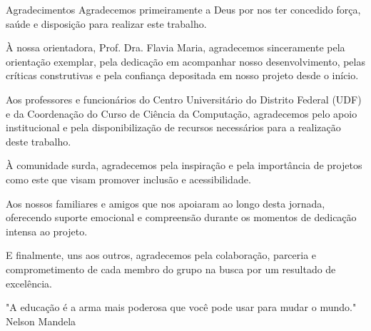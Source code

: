 \documentclass[
	10pt,				%
	openany,
    twoside,			%
	a4paper,			%
    chapter={TITLE},
    section={TITLE},
    subsection={TITLE},
    subsubsection={TITLE},
	english,			%
	french,				%
	spanish,			%
	brazil,				%
	sumario=tradicional
]{abntex2}
\begin{document}
\newpage
\begin{agradecimento}{Agradecimentos}
Agradecemos primeiramente a Deus por nos ter concedido força, saúde e disposição para realizar este trabalho.

À nossa orientadora, Prof. Dra. Flavia Maria, agradecemos sinceramente pela orientação exemplar, pela dedicação em acompanhar nosso desenvolvimento, pelas críticas construtivas e pela confiança depositada em nosso projeto desde o início.

Aos professores e funcionários do Centro Universitário do Distrito Federal (UDF) e da Coordenação do Curso de Ciência da Computação, agradecemos pelo apoio institucional e pela disponibilização de recursos necessários para a realização deste trabalho.

À comunidade surda, agradecemos pela inspiração e pela importância de projetos como este que visam promover inclusão e acessibilidade.

Aos nossos familiares e amigos que nos apoiaram ao longo desta jornada, oferecendo suporte emocional e compreensão durante os momentos de dedicação intensa ao projeto.

E finalmente, uns aos outros, agradecemos pela colaboração, parceria e comprometimento de cada membro do grupo na busca por um resultado de excelência.
\end{agradecimento}


\newpage
\begin{adjustwidth}{7cm}{0cm}
\vspace*{\fill}
\begin{flushright}
"A educação é a arma mais poderosa que você pode usar para mudar o mundo." \\
\vspace*{10pt}
Nelson Mandela
\end{flushright}
\end{adjustwidth}
\end{document}
